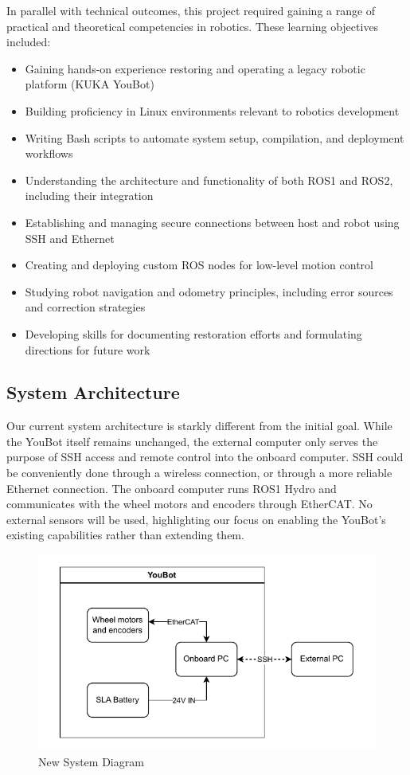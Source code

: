 \documentclass[a4paper, 12pt]{article}
\begin{document}
    In parallel with technical outcomes, this project required gaining a range of practical and theoretical competencies in robotics. These learning objectives included:
    \begin{itemize}[noitemsep, topsep=0pt]
        \item Gaining hands-on experience restoring and operating a legacy robotic platform (KUKA YouBot)
        \item Building proficiency in Linux environments relevant to robotics development
        \item Writing Bash scripts to automate system setup, compilation, and deployment workflows
        \item Understanding the architecture and functionality of both ROS1 and ROS2, including their integration
        \item Establishing and managing secure connections between host and robot using SSH and Ethernet
        \item Creating and deploying custom ROS nodes for low-level motion control
        \item Studying robot navigation and odometry principles, including error sources and correction strategies
        \item Developing skills for documenting restoration efforts and formulating directions for future work
    \end{itemize}

    \subsection{System Architecture}
    Our current system architecture is starkly different from the initial goal. While the YouBot itself remains unchanged, the external computer only serves the purpose of SSH access and remote control into the onboard computer. SSH could be conveniently done through a wireless connection, or through a more reliable Ethernet connection. The onboard computer runs ROS1 Hydro and communicates with the wheel motors and encoders through EtherCAT. No external sensors will be used, highlighting our focus on enabling the YouBot's existing capabilities rather than extending them. 
    
    \begin{figure}[H]
        \centering
        \includegraphics[width=\linewidth]{diagrams/new_arch.drawio.pdf}
        \caption{New System Diagram}
        \label{fig:new-system-diagram}
    \end{figure}
\end{document}
